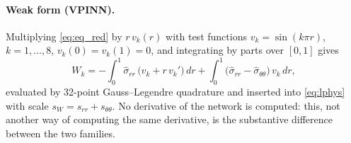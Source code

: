 \paragraph{Weak form (VPINN).}
Multiplying \eqref{eq:eq_red} by $r\,v_k(r)$ with test functions
$v_k=\sin(k\pi r)$, $k=1,\dots,8$, $v_k(0)=v_k(1)=0$, and integrating by parts over
$[0,1]$ gives \cite{TODO-vpinn}
\begin{equation}
  W_k = -\int_0^1 \hat\sigma_{rr}\,\bigl(v_k + r\,v_k'\bigr)\,dr
        + \int_0^1 \bigl(\hat\sigma_{rr}-\hat\sigma_{\theta\theta}\bigr)\,v_k\,dr ,
  \label{eq:weak}
\end{equation}
evaluated by 32-point Gauss--Legendre quadrature and inserted into
\eqref{eq:lphys} with scale $s_W=s_{rr}+s_{\theta\theta}$.
No derivative of the network is computed: this, not another way of computing the
same derivative, is the substantive difference between the two families.

